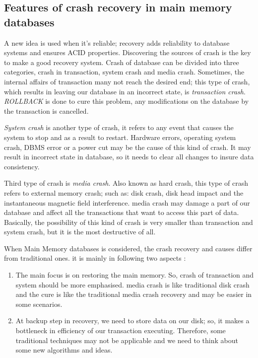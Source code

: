 \documentclass[12pt]{article} %
\begin{document}
\subsection{Features of crash recovery in main memory databases}

A new idea is used when it's reliable; recovery adds reliability to database systems and ensures ACID properties. Discovering the sources of crash is the key to make a good recovery system. Crash of database can be divided into three categories, crash in transaction, system crash and media crash. 
Sometimes, the internal affairs of transaction many not reach the desired end; this type of crash, which results in leaving our database in an incorrect state, is \emph{transaction crash}. \emph{ROLLBACK} is done to cure this problem, any modifications on the database by the transaction is cancelled.

\emph{System crash} is another type of crash, it refers to any event that causes the system to stop and as a result to restart. Hardware errors, operating system crash, DBMS error or a power cut may be the cause of this kind of crash. It may result in incorrect state in database, so it needs to clear all changes to insure data consistency.

Third type of crash is \emph{media crash}. Also known as hard crash, this type of crash refers to external memory crash; such as: disk crash, disk head impact and the instantaneous magnetic field interference. media crash may damage a part of our database and affect all the transactions that want to access this part of data. Basically, the possibility of this kind of crash is very smaller than transaction and system crash, but it is the most destructive of all.

When Main Memory databases is considered, the crash recovery and causes differ from traditional ones. it is mainly in following two aspects \cite{liangcheckpointing}:

\begin{enumerate}

  \item The main focus is on restoring the main memory. So, crash of transaction and system should be more emphasised. media crash is like traditional disk crash and the cure is like the traditional media crash recovery and may be easier in some scenarios.
  \item At backup step in recovery, we need to store data on our disk; so, it makes a bottleneck in efficiency of our transaction executing. Therefore, some traditional techniques may not be applicable and we need to think about some new algorithms and ideas.

\end{enumerate}
\end{document}
